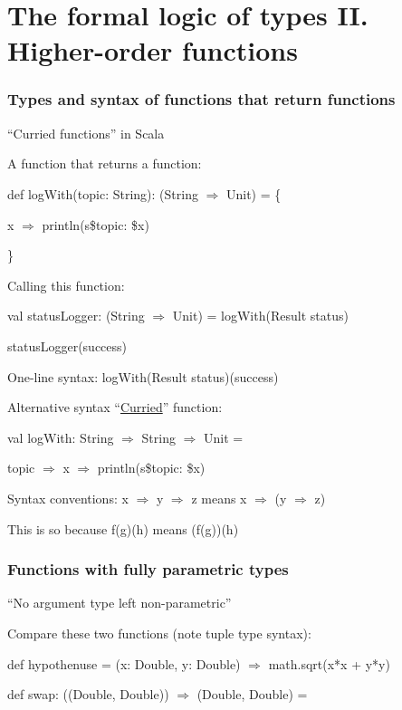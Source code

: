 
\chapter{The formal logic of types II. Higher-order functions\label{chap:Higher-order-functions} }

\subsection{Types and syntax of functions that return functions}

``Curried functions'' in Scala

A function that returns a function:

def logWith(topic: String): (String $\Rightarrow$ Unit) = \{

   x $\Rightarrow$ println(s\textquotedbl\$topic: \$x\textquotedbl )

\}

Calling this function:

val statusLogger: (String $\Rightarrow$ Unit) = logWith(\textquotedbl Result
status\textquotedbl )

statusLogger(\textquotedbl success\textquotedbl )

One-line syntax: logWith(\textquotedbl Result status\textquotedbl )(\textquotedbl success\textquotedbl ) 

Alternative syntax \textendash{} ``\href{https://en.wikipedia.org/wiki/Currying}{Curried}''
function:

val logWith: String $\Rightarrow$ String $\Rightarrow$ Unit = 

  topic $\Rightarrow$ x $\Rightarrow$ println(s\textquotedbl\$topic:
\$x\textquotedbl )

Syntax conventions: x $\Rightarrow$ y $\Rightarrow$ z means x $\Rightarrow$
(y $\Rightarrow$ z)

This is so because f(g)(h) means (f(g))(h) 

\subsection{Functions with fully parametric types}

``No argument type left non-parametric''

Compare these two functions (note tuple type syntax):

def hypothenuse = (x: Double, y: Double) $\Rightarrow$ math.sqrt(x{*}x
+ y{*}y)

def swap: ((Double, Double)) $\Rightarrow$ (Double, Double) =


